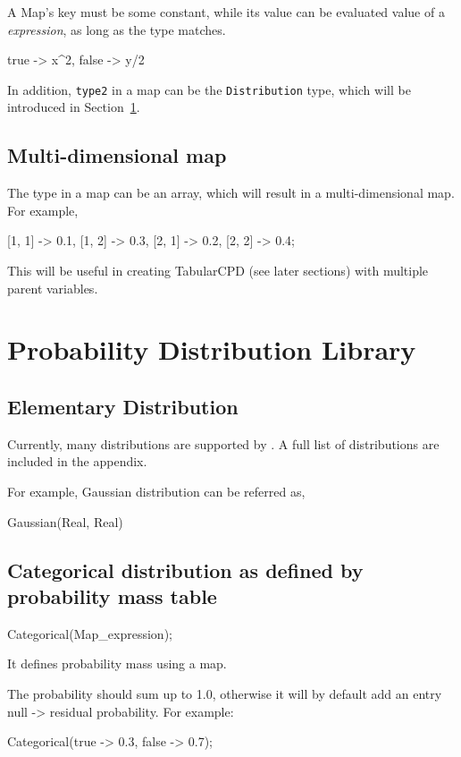 \documentclass[12pt]{article}
\begin{document}
A Map's key must be some constant, while its value can be evaluated value of a \emph{expression}, as long as the type matches.
\begin{blogcode}
{true -> x^2, false -> y/2}
\end{blogcode}

In addition, \texttt{type2}  in a map can be the \texttt{Distribution} type, which will be introduced in Section~\ref{sec:distribution}.

\subsection{Multi-dimensional map}
The type in a map can be an array, which will result in a multi-dimensional map.
For example,
\begin{blogcode}
{[1, 1] -> 0.1, [1, 2] -> 0.3, [2, 1] -> 0.2, [2, 2] -> 0.4};
\end{blogcode}

This will be useful in creating TabularCPD (see later sections) with multiple parent variables.


\section{Probability Distribution Library}
\label{sec:distribution}

\subsection{Elementary Distribution}
Currently, many distributions are supported by \bl. A full list of distributions are included in the appendix. 

For example, Gaussian distribution can be referred as,
\begin{blogcode}
Gaussian(Real, Real)
\end{blogcode}

\subsection{Categorical distribution as defined by probability mass table}
\begin{blogcode}
Categorical(Map_expression);
\end{blogcode}
It defines probability mass using a map.

The probability should sum up to 1.0, otherwise it will by default add an entry null -> residual probability.
For example:
\begin{blogcode}
Categorical({true -> 0.3, false -> 0.7});
\end{blogcode}
\end{document}
